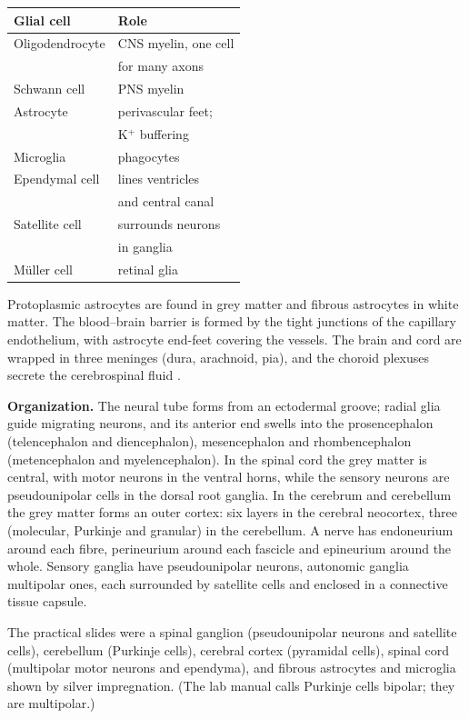 \begin{center}
\begin{tabular}{ll}
Glial cell & Role \\
\hline
Oligodendrocyte & CNS myelin, one cell \\
& for many axons \\
Schwann cell & PNS myelin \\
Astrocyte & perivascular feet; \\
& K$^+$ buffering \\
Microglia & phagocytes \\
Ependymal cell & lines ventricles \\
& and central canal \\
Satellite cell & surrounds neurons \\
& in ganglia \\
M\"uller cell & retinal glia \\
\end{tabular}
\end{center}

Protoplasmic astrocytes are found in grey
matter and fibrous astrocytes in white
matter. The blood--brain barrier is formed by
the tight junctions of the capillary
endothelium, with astrocyte end-feet covering
the vessels. The brain and cord are wrapped
in three meninges (dura, arachnoid, pia), and
the choroid plexuses secrete the
cerebrospinal fluid \cite[Chapter
12]{ross2011histology}.

\textbf{Organization.} The neural tube forms
from an ectodermal groove; radial glia guide
migrating neurons, and its anterior end
swells into the prosencephalon (telencephalon
and diencephalon), mesencephalon and
rhombencephalon (metencephalon and
myelencephalon). In the spinal cord the grey
matter is central, with motor neurons in the
ventral horns, while the sensory neurons are
pseudounipolar cells in the dorsal root
ganglia. In the cerebrum and cerebellum the
grey matter forms an outer cortex: six layers
in the cerebral neocortex, three (molecular,
Purkinje and granular) in the cerebellum. A
nerve has endoneurium around each fibre,
perineurium around each fascicle and
epineurium around the whole. Sensory ganglia
have pseudounipolar neurons, autonomic
ganglia multipolar ones, each surrounded by
satellite cells and enclosed in a connective
tissue capsule.

The practical slides were a spinal ganglion
(pseudounipolar neurons and satellite cells),
cerebellum (Purkinje cells), cerebral cortex
(pyramidal cells), spinal cord (multipolar
motor neurons and ependyma), and fibrous
astrocytes and microglia shown by silver
impregnation. (The lab manual calls Purkinje
cells bipolar; they are multipolar.)


